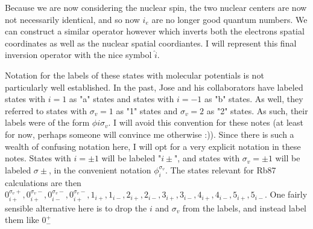\documentclass[prl, longbibliography]{revtex4-2}
\begin{document}
Because we are now considering the nuclear spin, the two nuclear centers are now not necessarily identical, and so now $i_e$ are no longer good quantum numbers. We can construct a similar operator however which inverts both the electrons spatial coordinates as well as the nuclear spatial coordiantes. I will represent this final inversion operator with the nice symbol $\hat{i}$. 

Notation for the labels of these states with molecular potentials is not particularly well established. In the past, Jose and his collaborators have labeled states with $i=1$ as "a" states and states with $i=-1$ as "b" states. As well, they referred to states with $\sigma_v=1$ as "1" states and $\sigma_v=2$ as "2" states. As such, their labels were of the form $\phi i \sigma_v$. I will avoid this convention for these notes (at least for now, perhaps someone will convince me otherwise :)). Since there is such a wealth of confusing notation here, I will opt for a very explicit notation in these notes. States with $i=\pm 1$ will be labeled "$i\pm$", and states with $\sigma_v=\pm1$ will be labeled $\sigma\pm$, in the convenient notation $\phi_i^{\sigma_v}$. The states relevant for Rb87 calculations are then $0_{i+}^{\sigma_v+},0_{i+}^{\sigma_v-},0_{i-}^{\sigma_v-},0_{i+}^{\sigma_v-}, 1_{i+},1_{i-},2_{i+},2_{i-},3_{i+},3_{i-},4_{i+},4_{i-},5_{i+},5_{i-}$. One fairly sensible alternative here is to drop the $i$ and $\sigma_v$ from the labels, and instead label them like $0^+_-$
\end{document}
